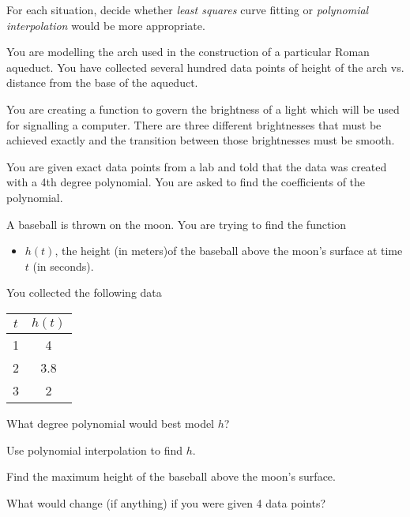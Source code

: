 \documentclass{workbook}
\begin{document}
\begin{slide}
	\question
	For each situation, decide whether \emph{least squares} curve fitting
	or \emph{polynomial interpolation} would be more appropriate.

	\begin{parts}
		\item You are modelling the arch used in the construction of a 
		particular Roman aqueduct. You have collected several hundred data points
		of height of the arch vs. distance from the base of the aqueduct.

		\item You are creating a function to govern the brightness of a light
		which will be used for signalling a computer. There are three different brightnesses
		that must be achieved exactly and the transition between those brightnesses must be smooth.

		\item You are given exact data points from a lab and told that the data was created with a 4th 
		degree polynomial. You are asked to find the coefficients of the polynomial.
	\end{parts}
\end{slide}

\begin{slide}
	\question
	A baseball is thrown on the moon. You are trying to find the function
	\begin{itemize}
		\item $h(t)$, the height (in meters)of the baseball above the moon's surface at time $t$ (in seconds).
	\end{itemize}
	You collected the following data

	\begin{center}
	\begin{tabular}{|c|c|}
		\hline
		$t$ & $h(t)$\\
		\hline
		1 & 4\\
		2 & 3.8\\
		3 & 2\\
		\hline
	\end{tabular}
	\end{center}

	\begin{parts}
		\item What degree polynomial would best model $h$?
		\item Use polynomial interpolation to find $h$.
		\item Find the maximum height of the baseball above the moon's surface.
		\item What would change (if anything) if you were given 4 data points?
	\end{parts}
\end{slide}
\end{document}
